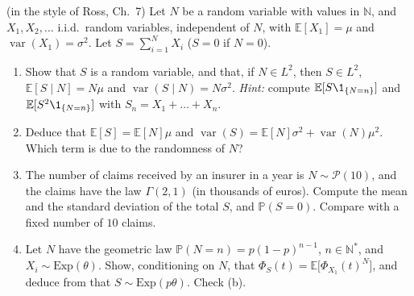 \begin{exercise}\label{ex:cp-random-sums}
\hard (in the style of Ross, Ch.~7) Let $N$ be a random variable with values in $\mathbb N$, and
$X_1,X_2,\dots$ i.i.d.\ random variables, independent of $N$, with $\mathbb E[X_1]=\mu$ and
$\operatorname{var}(X_1)=\sigma^2$. Let $S=\sum_{i=1}^NX_i$ ($S=0$ if $N=0$).
\begin{enumerate}[label=(\alph*)]
  \item Show that $S$ is a random variable, and that, if $N\in L^2$, then $S\in L^2$,
    $\mathbb E[S\mid N]=N\mu$ and $\operatorname{var}(S\mid N)=N\sigma^2$. \emph{Hint:} compute
    $\mathbb E[S\1_{\{N=n\}}]$ and $\mathbb E[S^2\1_{\{N=n\}}]$ with $S_n=X_1+\dots+X_n$.
  \item Deduce that $\mathbb E[S]=\mathbb E[N]\mu$ and
    $\operatorname{var}(S)=\mathbb E[N]\sigma^2+\operatorname{var}(N)\mu^2$. Which term is due to the
    randomness of $N$?
  \item The number of claims received by an insurer in a year is $N\sim\mathcal P(10)$, and the
    claims have the law $\Gamma(2,1)$ (in thousands of euros). Compute the mean and the standard
    deviation of the total $S$, and $\mathbb P(S=0)$. Compare with a fixed number of $10$ claims.
  \item Let $N$ have the geometric law $\mathbb P(N=n)=p(1-p)^{n-1}$, $n\in\mathbb N^*$, and
    $X_i\sim\mathrm{Exp}(\theta)$. Show, conditioning on $N$, that
    $\Phi_S(t)=\mathbb E\big[\Phi_{X_1}(t)^N\big]$, and deduce from  that
    $S\sim\mathrm{Exp}(p\theta)$. Check (b).
\end{enumerate}
\end{exercise}

